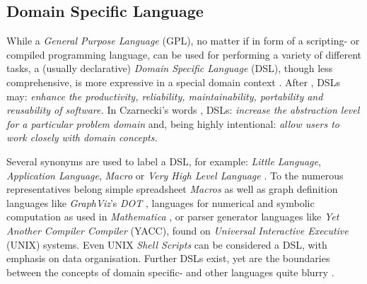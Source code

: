 %
%
%
%
%
%
%

\subsection{Domain Specific Language}
\label{domain_specific_language_heading}

While a \emph{General Purpose Language} (GPL), no matter if in form of a
scripting- or compiled programming language, can be used for performing a
variety of different tasks, a (usually declarative) \emph{Domain Specific Language}
(DSL), though less comprehensive, is more expressive in a special domain
context \cite{deursen}. After \cite{wikipedia}, DSLs may: \textit{enhance the
productivity, reliability, maintainability, portability and reusability of
software.} In Czarnecki's words \cite{czarnecki}, DSLs: \textit{increase the
abstraction level for a particular problem domain} and, being highly
intentional: \textit{allow users to work closely with domain concepts.}

Several synonyms are used to label a DSL, for example: \emph{Little Language},
\emph{Application Language}, \emph{Macro} or \emph{Very High Level Language}
\cite{wikipedia}. To the numerous representatives belong simple spreadsheet
\emph{Macros} as well as graph definition languages like \emph{GraphViz}'s
\emph{DOT} \cite{graphviz}, languages for numerical and symbolic computation as
used in \emph{Mathematica} \cite{mathematica}, or parser generator languages
like \emph{Yet Another Compiler Compiler} (YACC), found on
\emph{Universal Interactive Executive} (UNIX) systems. Even UNIX
\emph{Shell Scripts} can be considered a DSL, with emphasis on data
organisation. Further DSLs exist, yet are the boundaries between the concepts
of domain specific- and other languages quite blurry \cite{wikipedia}.

